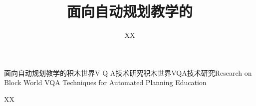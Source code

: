 \title{面向自动规划教学的}{面向自动规划教学的积木世界V Q A技术研究}{积木世界VQA技术研究}{}{Research on Block World VQA Techniques for Automated Planning Education}{}
\author{XX}{XX}
\authorizedate{}
\committeechair{}
\reviewer{}{}
\makebigcover
\makecover
